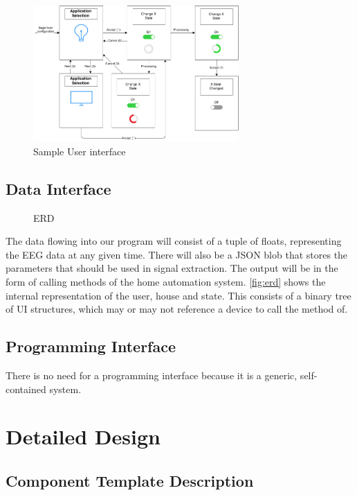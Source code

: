 \documentclass{article}
\begin{document}
\begin{figure}[h!]
	
  \centering
    \includegraphics[width=0.7\textwidth]{ApplicationUI}
   \caption{Sample User interface}
   \label{fig:ui}
\end{figure}

\subsection{Data Interface}
\begin{figure}[h!]

  \centering
  \resizebox{\textwidth}{!}{
        
    }
   \caption{ERD}
   	\label{fig:erd}
\end{figure}

The data flowing into our program will consist of a tuple of floats,
representing the EEG data at any given time. There will also be a JSON blob
that stores the parameters that should be used in signal extraction. The
output will be in the form of calling methods of the home automation system.
\autoref{fig:erd} shows the internal representation of the user, house and
state. This consists of a binary tree of UI structures, which may or may not
reference a device to call the method of.

\subsection{Programming Interface} 
There is no need for a programming interface because it is a generic, self-contained system.

\newpage

\section{Detailed Design}

\subsection{Component Template Description}
\end{document}
